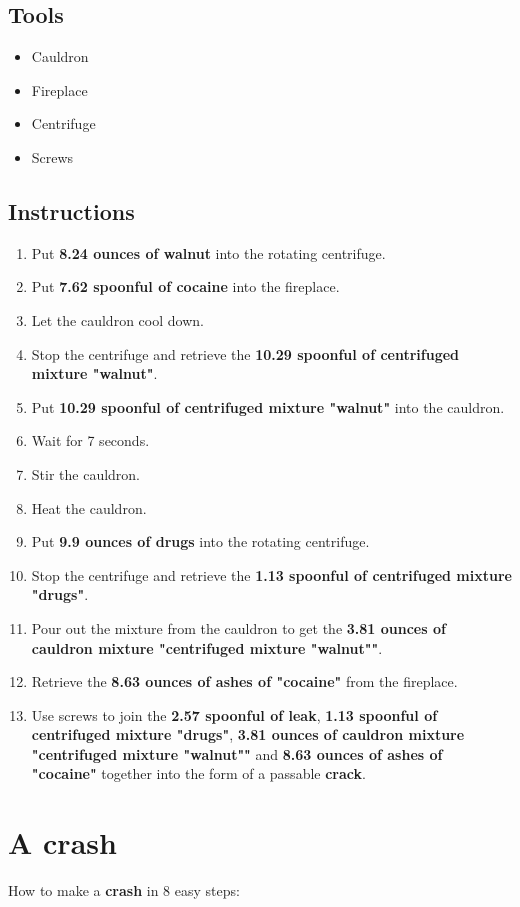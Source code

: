 \documentclass{article}
\begin{document}
\subsection{Tools}\begin{itemize}
\item 
Cauldron
\item 
Fireplace
\item 
Centrifuge
\item 
Screws
\end{itemize}
\subsection{Instructions}\begin{enumerate}
\item 
Put \textbf{8.24 ounces of walnut} into the rotating centrifuge.
\item 
Put \textbf{7.62 spoonful of cocaine} into the fireplace.
\item 
Let the cauldron cool down.
\item 
Stop the centrifuge and retrieve the \textbf{10.29 spoonful of centrifuged mixture "walnut"}.
\item 
Put \textbf{10.29 spoonful of centrifuged mixture "walnut"} into the cauldron.
\item 
Wait for 7 seconds.
\item 
Stir the cauldron.
\item 
Heat the cauldron.
\item 
Put \textbf{9.9 ounces of drugs} into the rotating centrifuge.
\item 
Stop the centrifuge and retrieve the \textbf{1.13 spoonful of centrifuged mixture "drugs"}.
\item 
Pour out the mixture from the cauldron to get the \textbf{3.81 ounces of cauldron mixture "centrifuged mixture "walnut""}.
\item 
Retrieve the \textbf{8.63 ounces of ashes of "cocaine"} from the fireplace.
\item 
Use screws to join the \textbf{2.57 spoonful of leak}, \textbf{1.13 spoonful of centrifuged mixture "drugs"}, \textbf{3.81 ounces of cauldron mixture "centrifuged mixture "walnut""} and \textbf{8.63 ounces of ashes of "cocaine"} together into the form of a passable \textbf{crack}.
\end{enumerate}
\newpage
\section{A crash}How to make a \textbf{crash} in 8 easy steps:
\end{document}
